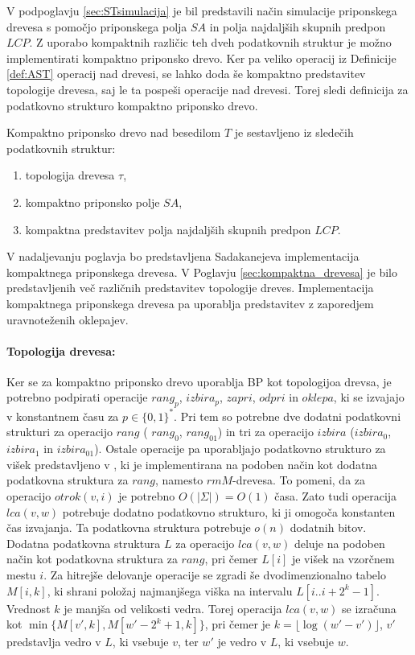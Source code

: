 V podpoglavju \ref{sec:STsimulacija} je bil predstavili način simulacije priponskega drevesa s pomočjo priponskega polja $SA$ in polja najdaljših skupnih predpon $LCP$. Z uporabo kompaktnih različic teh dveh podatkovnih struktur je možno implementirati kompaktno priponsko drevo. Ker pa veliko operacij iz Definicije \ref{def:AST} operacij nad drevesi, se lahko doda še kompaktno predstavitev topologije drevesa, saj le ta pospeši operacije nad drevesi. Torej sledi definicija za podatkovno strukturo kompaktno priponsko drevo.

\begin{defi}
    Kompaktno priponsko drevo nad besedilom $T$ je sestavljeno iz sledečih podatkovnih struktur:
    \begin{enumerate}
        \item topologija drevesa $\tau$,
        \item kompaktno priponsko polje $SA$, %
        \item kompaktna predstavitev polja najdaljših skupnih predpon $LCP$.
    \end{enumerate}
\end{defi}

V nadaljevanju poglavja bo predstavljena Sadakanejeva \cite{Sadakane2007} implementacija kompaktnega priponskega drevesa. V Poglavju \ref{sec:kompaktna_drevesa} je bilo predstavljenih več različnih predstavitev topologije dreves. Implementacija kompaktnega priponskega drevesa pa uporablja predstavitev z zaporedjem uravnoteženih oklepajev.

\paragraph{Topologija drevesa:}
Ker se za kompaktno priponsko drevo uporablja BP kot topologijoa drevsa, je potrebno podpirati operacije $rang_p$, $izbira_p$, $zapri$, $odpri$ in $oklepa$, ki se izvajajo v konstantnem času za $p\in\{0,1\} ^*$. Pri tem so potrebne dve dodatni podatkovni strukturi za operacijo $rang$ ( $rang_0$, $rang_{01}$) in tri za operacijo $izbira$ ($izbira_0$, $izbira_1$ in $izbira_{01}$). Ostale operacije pa uporabljajo podatkovno strukturo za višek predstavljeno v \cite{Munro1997}, ki je implementirana na podoben način kot dodatna podatkovna struktura za $rang$, namesto $rmM$-drevesa. To pomeni, da za operacijo $otrok(v,i)$ je potrebno $O(|\Sigma|)=O(1)$ časa. Zato tudi operacija $lca(v,w)$ potrebuje dodatno podatkovno strukturo, ki ji omogoča konstanten čas izvajanja. Ta podatkovna struktura potrebuje $o(n)$ dodatnih bitov. Dodatna podatkovna struktura $L$ za operacijo $lca(v,w)$ deluje na podoben način kot podatkovna struktura za $rang$, pri čemer $L[i]$ je višek na vzorčnem mestu $i$. Za hitrejše delovanje operacije se zgradi še dvodimenzionalno tabelo $M[i,k]$, ki  shrani položaj najmanjšega viška na intervalu $L[i..i+2^k-1]$. Vrednost $k$ je manjša od velikosti vedra. Torej operacija $lca(v,w)$ se izračuna kot $\min\{M[v',k],M[w'-2^k+1,k]\}$, pri čemer je $k=\lfloor \log{(w'-v')\rfloor}$, $v'$ predstavlja vedro v $L$, ki vsebuje $v$, ter $w'$ je vedro v $L$, ki vsebuje $w$. 

